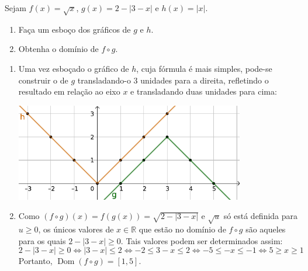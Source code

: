 \documentclass[12pt,a4paper]{article}
\newcommand*\dom[1]{\operatorname{Dom}\left(#1\right)}
\newcommand*\R{\mathbb{R}}
\begin{document}
\begin{ExerciseList}
\Exercise[title={2,0}] Sejam $f(x) = \sqrt{x}$, $g(x) = 2 - |3 - x|$ e $h(x) = |x|$.
\begin{enumerate}
\item Faça um esboço dos gráficos de $g$ e $h$.
\item Obtenha o domínio de $f \circ g$.
\end{enumerate}
\Answer
\begin{enumerate}
\item Uma vez esboçado o gráfico de $h$, cuja fórmula é mais simples, pode-se construir o de $g$ transladando-o 3 unidades para a direita, refletindo o resultado em relação ao eixo $x$ e transladando duas unidades para cima:
\begin{center}
\includegraphics[width=10cm]{img/prova-1-tads-graph-g-h}
\end{center}

\item Como $(f \circ g) (x) = f(g(x)) = \sqrt{ 2 - |3 - x| }$ e $\sqrt{u}$ só está definida para $u \geq 0$, os únicos valores de $x \in \R$ que estão no domínio de $f \circ g$ são aqueles para os quais $2 - |3 - x| \geq 0$. Tais valores podem ser determinados assim:
\[
2 - |3 - x| \geq 0
\Leftrightarrow
|3 - x| \leq 2
\Leftrightarrow
-2 \leq 3 - x \leq 2
\Leftrightarrow
-5 \leq - x \leq -1
\Leftrightarrow
5 \geq x \geq 1
\]
Portanto, $\dom{ f\circ g } = [1, 5]$.
\end{enumerate}


\end{ExerciseList}
\end{document}
